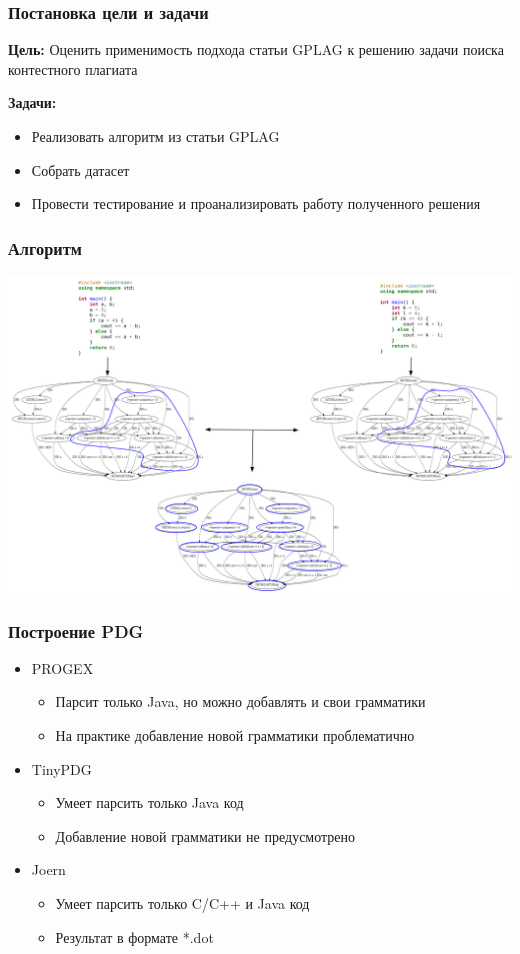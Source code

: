 \documentclass[10pt]{beamer}
\begin{document}
\begin{frame}\frametitle{Постановка цели и задачи}
    \textbf{Цель:} Оценить применимость подхода статьи GPLAG к решению задачи поиска контестного плагиата
    
    \textbf{Задачи:}
    \begin{itemize}
        \item Реализовать алгоритм из статьи GPLAG
        \item Собрать датасет
        \item Провести тестирование и проанализировать работу полученного решения
    \end{itemize}
\end{frame}

\begin{frame}\frametitle{Алгоритм}
\centering
\includegraphics[width=0.8\paperwidth,height=0.8\paperheight]{algo.png}
\end{frame}

\begin{frame}\frametitle{Построение PDG}
    \begin{itemize}
    	\item PROGEX
    	\begin{itemize}
    		\item Парсит только Java, но можно добавлять и свои грамматики
    		\item На практике добавление новой грамматики проблематично
    	\end{itemize}
    	\item TinyPDG
    	\begin{itemize}
    		\item Умеет парсить только Java код
    		\item Добавление новой грамматики не предусмотрено
    	\end{itemize}
        \item Joern
        \begin{itemize}
        	\item Умеет парсить только C/C++ и Java код
        	\item Результат в формате *.dot
        \end{itemize}
    \end{itemize}
\end{frame}
    
\end{document}
